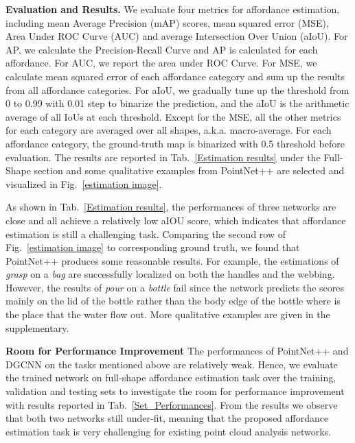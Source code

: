 \documentclass[final]{cvpr}
\begin{document}
\noindent\textbf{Evaluation and Results.} We evaluate four metrics for affordance estimation, including mean Average Precision (mAP) scores, {mean squared error (MSE), }Area Under ROC Curve (AUC) and average Intersection Over Union (aIoU). {For AP, we calculate the Precision-Recall Curve and AP is calculated for each affordance. For AUC, we report the area under ROC Curve. For MSE, we calculate mean squared error of each affordance category and sum up the results from all affordance categories. }For aIoU, we gradually tune up the threshold from 0 to 0.99 with 0.01 step to binarize the prediction, and the aIoU is the arithmetic average of all IoUs at each threshold. {Except for the MSE, all the other metrics }for each category are averaged over all shapes, a.k.a. macro-average. For each affordance category, the ground-truth map is binarized with 0.5 threshold before evaluation. The results are reported in Tab.~\ref{Estimation results} under the Full-Shape section and some qualitative examples from PointNet++ are selected and visualized in Fig.~\ref{estimation image}.



As shown in Tab.~\ref{Estimation results}, the performances of three networks are close and all achieve a relatively low aIOU score, which indicates that affordance estimation is still a challenging task. Comparing the second row of Fig.~\ref{estimation image} to corresponding ground truth, we found that PointNet++ produces some reasonable results. For example, the estimations of \textit{grasp} on a \textit{bag} are successfully localized on both the handles and the webbing. However, the results of \textit{pour} on a \textit{bottle} fail since the network predicts the scores mainly on the lid of the bottle rather than the body edge of the bottle where is the place that the water flow out. More qualitative examples are given in the supplementary.

\noindent\textbf{Room for Performance Improvement} \label{improvement}
The performances of PointNet++ and DGCNN on the tasks mentioned above are relatively weak. Hence, we evaluate the trained network on full-shape affordance estimation task over the training, validation and testing sets to investigate the room for performance improvement with results reported in Tab.~\ref{Set_Performances}. From the results we observe that both two networks still under-fit, meaning that the proposed affordance estimation task is very challenging for existing point cloud analysis networks.
\end{document}
